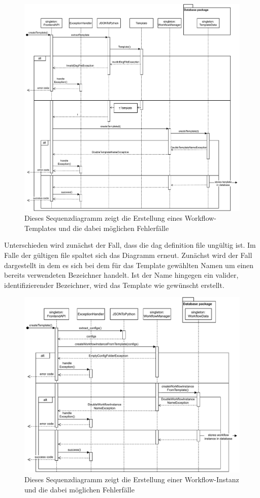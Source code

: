 \begin{figure}[H]
	\centering
	\includegraphics[width=\textwidth]{res/createTemplate.pdf} 
	\caption{Dieses Sequenzdiagramm zeigt die Erstellung eines Workflow-Templates und die dabei möglichen Fehlerfälle}
\end{figure}
Unterschieden wird zunächst der Fall, dass die dag definition file ungültig ist. Im Falle der gültigen file spaltet sich das Diagramm erneut. Zunächst wird der Fall dargestellt in dem es sich bei dem für das Template gewählten Namen um einen bereits verwendeten Bezeichner handelt. Ist der Name hingegen ein valider, identifizierender Bezeichner, wird das Template wie gewünscht erstellt.
\begin{figure}[H]
	\centering
	\includegraphics[width=\textwidth]{res/createWorkflowInstance.pdf} 
	\caption{Dieses Sequenzdiagramm zeigt die Erstellung einer Workflow-Instanz und die dabei möglichen Fehlerfälle}
\end{figure}
